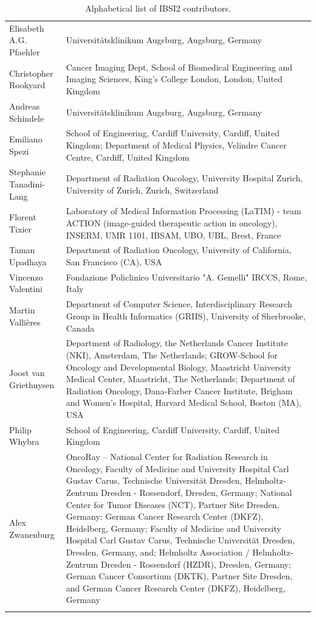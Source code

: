 \documentclass[fleqn,a4paper,oneside,openany]{book}
\begin{document}
\begin{longtable}{p{4cm}p{10cm}}
Elisabeth A.G. Pfaehler
& Universitätsklinikum Augsburg, Augsburg, Germany\\ 
Christopher Rookyard
& Cancer Imaging Dept, School of Biomedical Engineering and Imaging Sciences, King’s College London, London, United Kingdom\\ 
Andreas Schindele
& Universitätsklinikum Augsburg, Augsburg, Germany\\ 
Emiliano Spezi
& School of Engineering, Cardiff University, Cardiff, United Kingdom; Department of Medical Physics, Velindre Cancer Centre, Cardiff, United Kingdom\\ 
Stephanie Tanadini-Lang
& Department of Radiation Oncology, University Hospital Zurich, University of Zurich, Zurich, Switzerland\\ 
Florent Tixier
& Laboratory of Medical Information Processing (LaTIM) - team ACTION (image-guided therapeutic action in oncology), INSERM, UMR 1101, IBSAM, UBO, UBL, Brest, France\\ 
Taman Upadhaya
& Department of Radiation Oncology, University of California, San Francisco (CA), USA\\ 
Vincenzo Valentini
& Fondazione Policlinico Universitario "A. Gemelli" IRCCS, Rome, Italy\\ 
Martin Valli{\`e}res
& Department of Computer Science, Interdisciplinary Research Group in Health Informatics (GRIIS), University of Sherbrooke, Canada\\ 
Joost van Griethuysen
& Department of Radiology, the Netherlands Cancer Institute (NKI), Amsterdam, The Netherlands; GROW-School for Oncology and Developmental Biology, Maastricht University Medical Center, Maastricht, The Netherlands; Department of Radiation Oncology, Dana-Farber Cancer Institute, Brigham and Women’s Hospital, Harvard Medical School, Boston (MA), USA\\ 
Philip Whybra
& School of Engineering, Cardiff University, Cardiff, United Kingdom\\ 
Alex Zwanenburg
& OncoRay – National Center for Radiation Research in Oncology, Faculty of Medicine and University Hospital Carl Gustav Carus, Technische Universität Dresden, Helmholtz-Zentrum Dresden - Rossendorf, Dresden, Germany; National Center for Tumor Diseases (NCT), Partner Site Dresden, Germany: German Cancer Research Center (DKFZ), Heidelberg, Germany; Faculty of Medicine and University Hospital Carl Gustav Carus, Technische Universität Dresden, Dresden, Germany, and; Helmholtz Association / Helmholtz-Zentrum Dresden - Rossendorf (HZDR), Dresden, Germany; German Cancer Consortium (DKTK), Partner Site Dresden, and German Cancer Research Center (DKFZ), Heidelberg, Germany\\ 
 
\bottomrule
\caption{Alphabetical list of IBSI2 contributors.\label{participantList}}
\end{longtable}
\newpage
\setcounter{tocdepth}{1}
\tableofcontents
\end{document}
